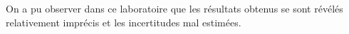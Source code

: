 On a pu observer dans ce laboratoire que les résultats obtenus se sont révélés relativement imprécis et les incertitudes mal estimées.
